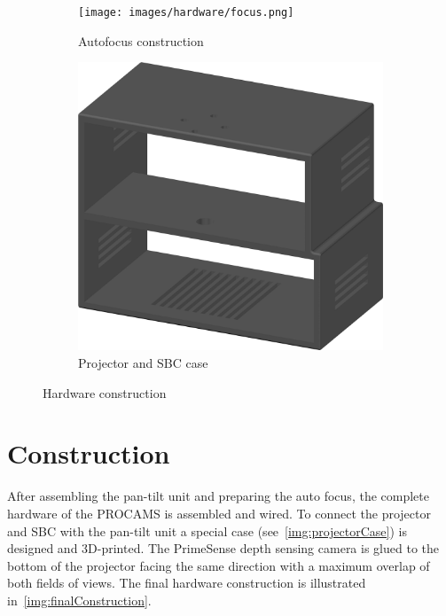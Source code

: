 \begin{figure}[htbp]
        \centering
        \begin{subfigure}[b]{0.61\textwidth}
                \texttt{[image: images/hardware/focus.png]}
          	\caption{Autofocus construction}
         	\label{fig:autofocus}
        \end{subfigure}
          \hfill
        \begin{subfigure}[b]{0.31\textwidth}
                \includegraphics[width=\textwidth]{images/cad/case.png}
                \caption{Projector and SBC case}
                \label{img:projectorCase}
        \end{subfigure}
        \caption{Hardware construction}\label{img:cad}
\end{figure}
	
\section{Construction}
After assembling the pan-tilt unit and preparing the auto focus, the complete hardware of the PROCAMS is assembled and wired. To connect the projector and SBC with the pan-tilt unit a special case (see~\autoref{img:projectorCase}) is designed and 3D-printed. The PrimeSense depth sensing camera is glued to the bottom of the projector facing the same direction with a maximum overlap of both fields of views. The final hardware construction is illustrated in~\autoref{img:finalConstruction}. 


